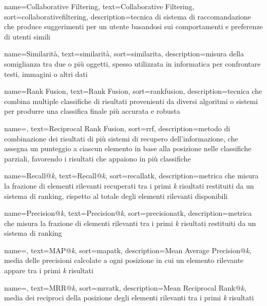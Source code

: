  {
    name=Collaborative Filtering,
    text=Collaborative Filtering,
    sort=collaborativefiltering,
    description={tecnica di sistema di raccomandazione che produce suggerimenti per un utente basandosi sui comportamenti e preferenze di utenti simili}
}

 {
    name=Similarità,
    text=similarità,
    sort=similarita,
    description={misura della somiglianza tra due o più oggetti, spesso utilizzata in informatica per confrontare testi, immagini o altri dati}
}

 {
    name=Rank Fusion,
    text=Rank Fusion,
    sort=rankfusion,
    description={tecnica che combina multiple classifiche di risultati provenienti da diversi algoritmi o sistemi per produrre una classifica finale più accurata e robusta}
}

 {
    name=,
    text=Reciprocal Rank Fusion,
    sort=rrf,
    description={metodo di combinazione dei risultati di più sistemi di recupero dell'informazione, che assegna un punteggio a ciascun elemento in base alla posizione nelle classifiche parziali, favorendo i risultati che appaiono in più classifiche}
}

 {
    name=Recall@\emph{k},
    text=Recall@\emph{k},
    sort=recallatk,
    description={metrica che misura la frazione di elementi rilevanti recuperati tra i primi \emph{k} risultati restituiti da un sistema di ranking, rispetto al totale degli elementi rilevanti disponibili}
}

 {
    name=Precision@\emph{k},
    text=Precision@\emph{k},
    sort=precisionatk,
    description={metrica che misura la frazione di elementi rilevanti tra i primi \emph{k} risultati restituiti da un sistema di ranking}
}

 {
    name=,
    text=MAP@\emph{k},
    sort=mapatk,
    description={Mean Average Precision@\emph{k}, media delle precisioni calcolate a ogni posizione in cui un elemento rilevante appare tra i primi \emph{k} risultati}
}

 {
    name=,
    text=MRR@\emph{k},
    sort=mrratk,
    description={Mean Reciprocal Rank@\emph{k}, media dei reciproci della posizione degli elementi rilevanti tra i primi \emph{k} risultati}
}

